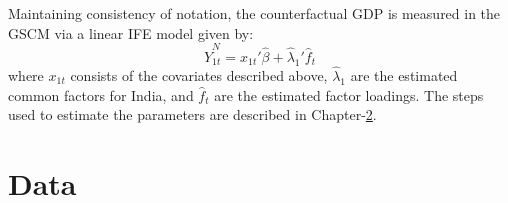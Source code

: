 \documentclass[12pt,nobind, a4paper]{reedthesis}
\begin{document}
 Maintaining consistency of notation, the counterfactual GDP is measured in the GSCM via a linear IFE model given by:
 \begin{equation}
 \hat{Y}_{1t}^{N}=x_{1t}'\hat{\beta}+\hat{\lambda}_{1}'\hat{f}_{t}
 \label{eq:eq009}
 \end{equation}
 where \(x_{1t}\) consists of the covariates described above, \(\hat{\lambda}_{1}\) are the estimated common factors for India, and \(\hat{f}_{t}\) are the estimated factor loadings. The steps used to estimate the parameters are described in Chapter-\protect\hyperlink{ch2}{2}.

 \hypertarget{dat}{%
 \section{Data}\label{dat}}
\end{document}
